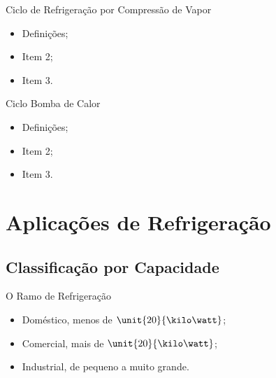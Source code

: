     \begin{frame}{Ciclo de Refrigeração por Compressão de Vapor}\vspace*{-2em}
        \begin{itemize}
            \item<1-> Definições;
            \item<1-> Item 2;
            \item<1-> Item 3.
        \end{itemize}
    \end{frame}

    \begin{frame}{Ciclo Bomba de Calor}\vspace*{-2em}
        \begin{itemize}
            \item<1-> Definições;
            \item<1-> Item 2;
            \item<1-> Item 3.
        \end{itemize}
    \end{frame}

\section{Aplicações de Refrigeração}

\subsection{Classificação por Capacidade}

    \begin{frame}{O Ramo de Refrigeração}\vspace*{-2em}
        \begin{itemize}
            \item<1-> Doméstico, \alert{menos de $\unit{20}{\kilo\watt}$};
            \item<2-> Comercial, \alert{mais de $\unit{20}{\kilo\watt}$};
            \item<3-> Industrial, \alert{de pequeno a muito grande}.
        \end{itemize}
    \end{frame}

